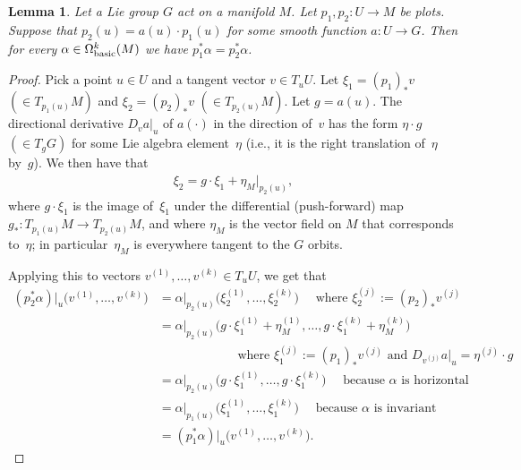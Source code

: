 \documentclass[pdftex]{sigma}
\numberwithin{equation}{section}
\newtheorem{Lemma}[Theorem]{Lemma}
\begin{document}
\begin{Lemma}\label{l:smooth case}
Let a Lie group $G$ act on a manifold $M$.
Let $p_1, p_2 \colon U \to M$ be plots.
Suppose that $p_2(u) = a(u) \cdot p_1(u)$
for some smooth function $a \colon U \to G$.
Then for every $\alpha \in \Omega^k_{\rm basic}(M)$
we have $p_1^*\alpha = p_2^*\alpha$.
\end{Lemma}

\begin{proof}
Pick a point $u \in U$ and a tangent vector $v \in T_uU$.
Let $\xi_1 = (p_1)_*v $ $\left( \in T_{p_1(u)}M \right)$
and $\xi_2 = (p_2)_*v$ $\left( \in T_{p_2(u)}M \right)$.
Let $g = a(u)$.
The directional derivative $D_v a|_u$ of $a(\cdot)$
in the direction of~$v$ has the form $\eta \cdot g$ $\left( \in T_gG \right)$
for some Lie algebra element~$\eta$ (i.e., it is the right translation
of~$\eta$ by~$g$).
We then have that
\begin{gather*} \xi_2 = g \cdot \xi_1 + {\eta_M}|_{p_2(u)}, \end{gather*}
where $g \cdot \xi_1$ is the image of~$\xi_1$
under the dif\/ferential (push-forward) map
$ g_* \colon T_{p_1(u)}M \to T_{p_2(u)}M $,
and where $\eta_M$ is the vector f\/ield on $M$
that corresponds to~$\eta$;
in particular~$\eta_M$ is everywhere tangent to the $G$ orbits.

Applying this to vectors $v^{(1)}, \ldots, v^{(k)} \in T_uU$,
we get that
\begin{align*}
 (p_2^* \alpha)|_u \big( v^{(1)} , \ldots , v^{(k)} \big)
 &= \alpha|_{ p_2(u) } \big( \xi_2^{(1)} , \ldots ,
 \xi_2^{(k)} \big)
 \quad \text{ where } \xi_2^{(j)} := (p_2)_* v^{(j)} \\
 &= \alpha|_{ p_2(u) }
 \big( g \cdot \xi_1^{(1)} + \eta^{(1)}_M , \ldots ,
 g \cdot \xi_1^{(k)} + \eta^{(k)}_M \big) \\
 & \qquad\qquad\qquad \text{ where } \xi_1^{(j)} := (p_1)_* v^{(j)}
 \text{ and }
 D_{v^{(j)}} a|_u = \eta^{(j)} \cdot g \\
 &= \alpha|_{ p_2(u) } \big( g \cdot \xi_1^{(1)} , \ldots ,
 g \cdot \xi_1^{(k)} \big)
 \quad \text{ because $\alpha$ is horizontal } \\
 &= \alpha|_{ p_1(u) } \big( \xi_1^{(1)} , \ldots ,
 \xi_1^{(k)} \big)
 \quad \text{ because $\alpha$ is invariant } \\
 &= (p_1^* \alpha)|_u \big( v^{(1)} , \ldots , v^{(k)} \big).\tag*{\qed}
\end{align*}
 \renewcommand{\qed}{}
\end{proof}
\end{document}
